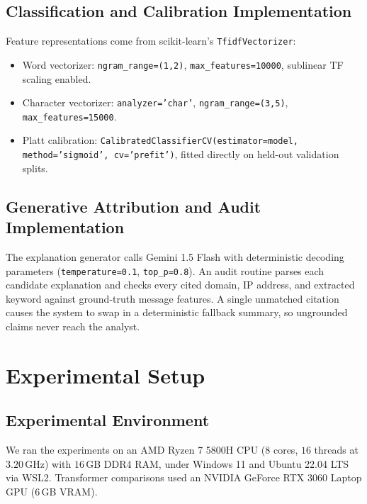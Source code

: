\documentclass[conference]{IEEEtran}
\begin{document}
\subsection{Classification and Calibration Implementation}
Feature representations come from scikit-learn's \texttt{TfidfVectorizer}:
\begin{itemize}
    \item Word vectorizer: \texttt{ngram\_range=(1,2)}, \texttt{max\_features=10000}, sublinear TF scaling enabled.
    \item Character vectorizer: \texttt{analyzer='char'}, \texttt{ngram\_range=(3,5)}, \texttt{max\_features=15000}.
    \item Platt calibration: \texttt{CalibratedClassifierCV(estimator=model, method='sigmoid', cv='prefit')}, fitted directly on held-out validation splits.
\end{itemize}

\subsection{Generative Attribution and Audit Implementation}
The explanation generator calls Gemini 1.5 Flash with deterministic decoding parameters (\texttt{temperature=0.1}, \texttt{top\_p=0.8}). An audit routine parses each candidate explanation and checks every cited domain, IP address, and extracted keyword against ground-truth message features. A single unmatched citation causes the system to swap in a deterministic fallback summary, so ungrounded claims never reach the analyst.

\section{Experimental Setup}
\label{sec:setup}

\subsection{Experimental Environment}
We ran the experiments on an AMD Ryzen 7 5800H CPU ($8$ cores, $16$ threads at $3.20$\,GHz) with $16$\,GB DDR4 RAM, under Windows 11 and Ubuntu 22.04 LTS via WSL2. Transformer comparisons used an NVIDIA GeForce RTX 3060 Laptop GPU ($6$\,GB VRAM).
\end{document}
